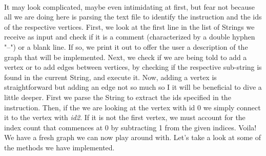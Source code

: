 \documentclass[letterpaper, 10pt]{article}
\begin{document}
\\
It may look complicated, maybe even intimidating at first, but fear not because all we are doing here is parsing the text file to identify the instruction and the ids of the respective vertices. First, we look at the first line in the list of Strings we receive as input and check if it is a comment (characterized by a double hyphen "--") or a blank line. If so, we print it out to offer the user a description of the graph that will be implemented. Next, we check if we are being told to add a vertex or to add edges between vertices, by checking if the respective sub-string is found in the current String, and execute it. Now, adding a vertex is straightforward but adding an edge not so much so I it will be beneficial to dive a little deeper. First we parse the String to extract the ids specified in the instruction. Then, if the we are looking at the vertex with id 0 we simply connect it to the vertex with \textit{id2}. If it is not the first vertex, we must account for the index count that commences at 0 by subtracting 1 from the given indices. Voila! We have a fresh graph we can now play around with. Let's take a look at some of the methods we have implemented.
\\
\end{document}
